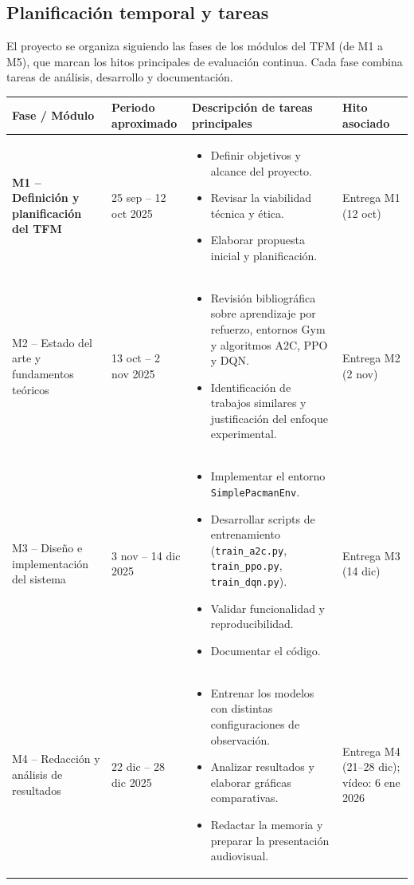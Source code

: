 \documentclass[12pt,a4paper,twoside,openany]{book}
\begin{document}
\subsection{Planificación temporal y tareas}

El proyecto se organiza siguiendo las fases de los módulos del TFM (de M1 a M5), que marcan los hitos principales de evaluación continua. Cada fase combina tareas de análisis, desarrollo y documentación.

\begin{longtable}{|>{\bfseries}p{3cm}|p{2.8cm}|p{7.8cm}|p{2.8cm}|}
\hline
Fase / Módulo & Periodo aproximado & Descripción de tareas principales & Hito asociado \\
\hline
M1 -- Definición y planificación del TFM & 25 sep -- 12 oct 2025 & 
\begin{itemize}
\item Definir objetivos y alcance del proyecto.
\item Revisar la viabilidad técnica y ética.
\item Elaborar propuesta inicial y planificación.
\end{itemize} & Entrega M1 (12 oct) \\ \hline

M2 -- Estado del arte y fundamentos teóricos & 13 oct -- 2 nov 2025 &
\begin{itemize}
\item Revisión bibliográfica sobre aprendizaje por refuerzo, entornos Gym y algoritmos A2C, PPO y DQN.
\item Identificación de trabajos similares y justificación del enfoque experimental.
\end{itemize} & Entrega M2 (2 nov) \\ \hline

M3 -- Diseño e implementación del sistema & 3 nov -- 14 dic 2025 &
\begin{itemize}
\item Implementar el entorno \texttt{SimplePacmanEnv}.
\item Desarrollar scripts de entrenamiento (\texttt{train\_a2c.py}, \texttt{train\_ppo.py}, \texttt{train\_dqn.py}).
\item Validar funcionalidad y reproducibilidad.
\item Documentar el código.
\end{itemize} & Entrega M3 (14 dic) \\ \hline

M4 -- Redacción y análisis de resultados & 22 dic -- 28 dic 2025 &
\begin{itemize}
\item Entrenar los modelos con distintas configuraciones de observación.
\item Analizar resultados y elaborar gráficas comparativas.
\item Redactar la memoria y preparar la presentación audiovisual.
\end{itemize} & Entrega M4 (21--28 dic); vídeo: 6 ene 2026 \\ \hline


\end{longtable}
\end{document}
